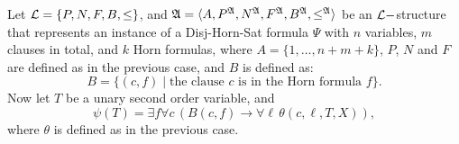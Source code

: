 Let ${\cal L} = \{P,N,F,B,\leq\}$, and ${\frak A} = \langle A, P^{\frak A}, N^{\frak A}, F^{\frak A}, B^{\frak A}, \leq^{\frak A} \rangle$ be an ${\cal L}-$structure that represents an instance of a {\sc Disj-Horn-Sat} formula $\Psi$ with $n$ variables, $m$ clauses in total, and $k$ Horn formulas, where $A = \{1,\ldots,n+m+k\}$, $P$, $N$ and $F$ are defined as in the previous case, and $B$ is defined as:
\[
	B = \{ (c,f) \mid 
		\mbox{the clause $c$ is in the Horn formula $f$}
	\}.
\]
Now let $T$ be a unary second order variable, and
\[
	\psi(T) = \exists f\forall c\,(B(c,f)\to \forall\ell\,\theta(c,\ell,T,X)),
\]
where $\theta$ is defined as in the previous case.